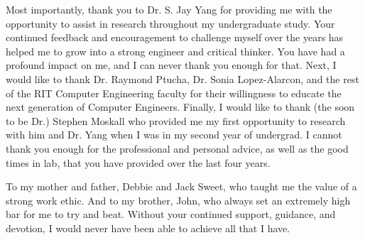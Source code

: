 %
%
%


\frontmatter


\begin{acknowledgments}
	\vfill
	\begin{center}
		\indent Most importantly, thank you to Dr. S. Jay Yang for providing me with the opportunity to assist in research throughout my undergraduate study. Your continued feedback and encouragement to challenge myself over the years has helped me to grow into a strong engineer and critical thinker. You have had a profound impact on me, and I can never thank you enough for that. Next, I would like to thank Dr. Raymond Ptucha, Dr. Sonia Lopez-Alarcon, and the rest of the RIT Computer Engineering faculty for their willingness to educate the next generation of Computer Engineers. Finally, I would like to thank (the soon to be Dr.) Stephen Moskall who provided me my first opportunity to research with him and Dr. Yang when I was in my second year of undergrad. I cannot thank you enough for the professional and personal advice, as well as the good times in lab, that you have provided over the last four years.  
	\end{center}
	\vfill
\end{acknowledgments}


\begin{dedication}
	\vfill
	\begin{center}
		To my mother and father, Debbie and Jack Sweet, who taught me the value of a strong work ethic. And to my brother, John, who always set an extremely high bar for me to try and beat. Without your continued support, guidance, and devotion, I would never have been able to achieve all that I have. 
	\end{center}
	\vfill
\end{dedication}

